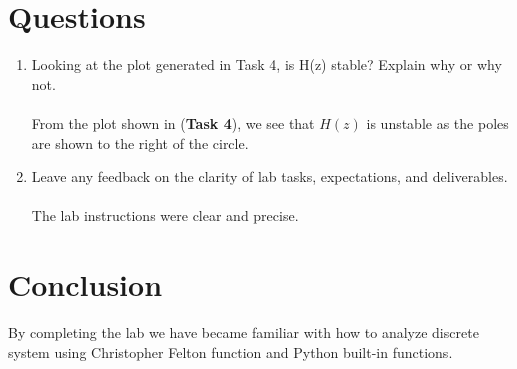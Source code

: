 \documentclass[12pt,a4paper]{article}
\begin{document}
\section{Questions}\label{sec:res}
\begin{enumerate}
    \item 
    Looking at the plot generated in Task 4, is H(z) stable? Explain why or why not.\\
    
    \\From the plot shown in (\textbf{Task 4}), we see that $H(z)$ is unstable as the poles are shown to the right of the circle.\\
    
    \item Leave any feedback on the clarity of lab tasks, expectations, and deliverables.\\
    
    \\The lab instructions were clear and precise.
\end{enumerate}

\section{Conclusion}\label{sec:res}
    
    By completing the lab we have became familiar with how to analyze discrete system using Christopher Felton function and Python built-in functions.
 


\end{document}

